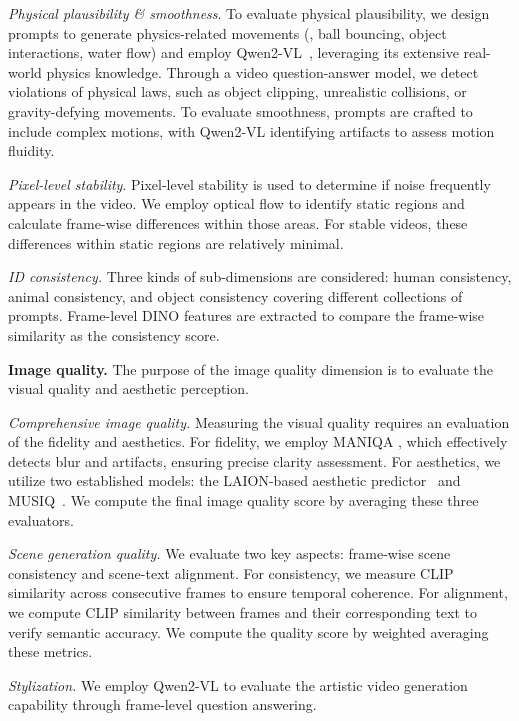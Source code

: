 \textit{Physical plausibility \& smoothness}. To evaluate physical plausibility, we design prompts to generate physics-related movements (\eg, ball bouncing, object interactions, water flow) and employ Qwen2-VL~\citep{qwenvl}, leveraging its extensive real-world physics knowledge. 
%
Through a video question-answer model, we detect violations of physical laws, such as object clipping, unrealistic collisions, or gravity-defying movements.
To evaluate smoothness, prompts are crafted to include complex motions, with Qwen2-VL identifying artifacts to assess motion fluidity.



\textit{Pixel-level stability}.
Pixel-level stability is used to determine if noise frequently appears in the video. We employ optical flow to identify static regions and calculate frame-wise differences within those areas. 
For stable videos, these differences within static regions are relatively minimal.


\textit{ID consistency.} Three kinds of sub-dimensions are considered: human consistency, animal consistency, and object consistency covering different collections of prompts. Frame-level DINO \citep{2021Emerging} features are extracted to compare the frame-wise similarity as the consistency score.

\textbf{Image quality.} The purpose of the image quality dimension is to evaluate the visual quality and aesthetic perception.


\textit{Comprehensive image quality.} Measuring the visual quality requires an evaluation of the fidelity and aesthetics. 
For fidelity, we employ MANIQA \citep{2022MANIQA}, which effectively detects blur and artifacts, ensuring precise clarity assessment. 
For aesthetics, we utilize two established models: the LAION-based aesthetic predictor~\citep{LAION-AI_aesthetic-predictor_2022} and MUSIQ~\citep{2021MUSIQ}. We compute the final image quality score by averaging these three evaluators.


\textit{Scene generation quality.}
We evaluate two key aspects: frame-wise scene consistency and scene-text alignment. For consistency, we measure CLIP similarity \citep{radford2021learning} across consecutive frames to ensure temporal coherence. 
For alignment, we compute CLIP similarity between frames and their corresponding text to verify semantic accuracy. 
We compute the quality score by weighted averaging these metrics.


\textit{Stylization.} We employ Qwen2-VL to evaluate the artistic video generation capability through frame-level question answering.


